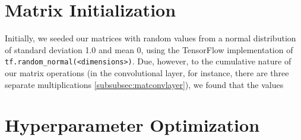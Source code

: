 \section{Matrix Initialization}
Initially, we seeded our matrices with random values from a normal distribution 
of standard deviation 1.0 and mean 0, using the TensorFlow implementation of 
\texttt{tf.random\_normal(<dimensions>)}. Due, however, to the cumulative nature 
of our matrix operations (in the convolutional layer, for instance, there are 
three separate multiplications \ref{subsubsec:matconvlayer}), we found that the 
values 

\section{Hyperparameter Optimization}
